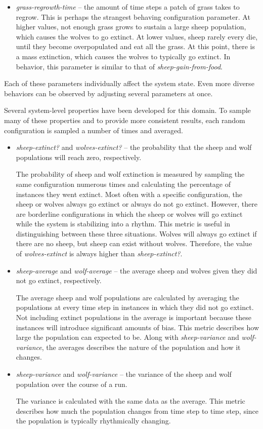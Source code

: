 \begin{itemize}
   \item \textit{grass-regrowth-time} -- the amount of time steps a patch of grass takes to regrow.
This is perhaps the strangest behaving configuration parameter.
At higher values, not enough grass grows to sustain a large sheep population, which causes the wolves to go extinct.
At lower values, sheep rarely every die, until they become overpopulated and eat all the grass.
At this point, there is a mass extinction, which causes the wolves to typically go extinct.
In behavior, this parameter is similar to that of \textit{sheep-gain-from-food}.

\end{itemize}
Each of these parameters individually affect the system state.
Even more diverse behaviors can be observed by adjusting several parameters at once.

Several system-level properties have been developed for this domain.
To sample many of these properties and to provide more consistent results, each random configuration is sampled a number of times and averaged.
\begin{itemize}
\item \textit{sheep-extinct?} and \textit{wolves-extinct?} -- the probability that the sheep and wolf populations will reach zero, respectively.

The probability of sheep and wolf extinction is measured by sampling the same configuration numerous times and calculating the percentage of instances they went extinct.
Most often with a specific configuration, the sheep or wolves always go extinct or always do not go extinct.
However, there are borderline configurations in which the sheep or wolves will go extinct while the system is stabilizing into a rhythm.
This metric is useful in distinguishing between these three situations.
Wolves will always go extinct if there are no sheep, but sheep can exist without wolves.
Therefore, the value of \textit{wolves-extinct} is always higher than \textit{sheep-extinct?}.

\item \textit{sheep-average} and \textit{wolf-average} -- the average sheep and wolves given they did not go extinct, respectively.

The average sheep and wolf populations are calculated by averaging the populations at every time step in instances in which they did not go extinct.
Not including extinct populations in the average is important because these instances will introduce significant amounts of bias.
This metric describes how large the population can expected to be.
Along with \textit{sheep-variance} and \textit{wolf-variance}, the averages describes the nature of the population and how it changes.

\item \textit{sheep-variance} and \textit{wolf-variance} -- the variance of the sheep and wolf population over the course of a run.

The variance is calculated with the same data as the average.
This metric describes how much the population changes from time step to time step, since the population is typically rhythmically changing.

\end{itemize}

